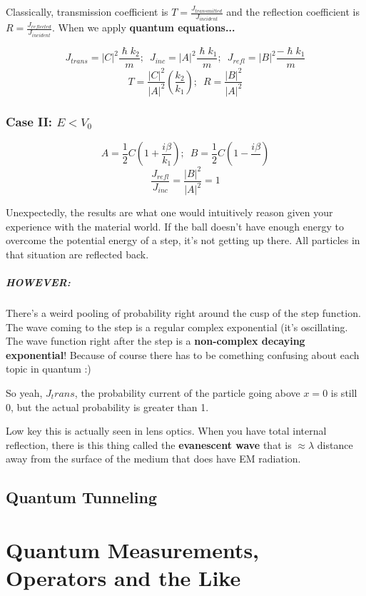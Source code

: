 \documentclass[a4paper,12pt]{report}
\begin{document}
Classically, transmission coefficient is $T = \frac{J_{transmitted}}{J_{incident}}$ and the reflection coefficient is $R = \frac{J_{reflected}}{J_{incident}}$. When we apply \textbf{quantum equations...}

$$J_{trans} = |C|^2\frac{\hslash k_2}{m};\,\,\, J_{inc} = |A|^2\frac{\hslash k_1}{m};\,\,\, J_{refl} = |B|^2 \frac{-\hslash k_1}{m}$$
$$T = \frac{|C|^2}{|A|^2}(\frac{k_2}{k_1});\,\,\, R = \frac{|B|^2}{|A|^2}$$

\subsection{Case II: $E < V_0$}

$$A = \frac{1}{2}C(1 + \frac{i\beta}{k_1});\,\,\, B = \frac{1}{2}C(1-\frac{i\beta}{})$$
$$\frac{J_{refl}}{J_{inc}} = \frac{|B|^2}{|A|^2} = 1$$

Unexpectedly, the results are what one would intuitively reason given your experience with the material world. If the ball doesn't have enough energy to overcome the potential energy of a step, it's not getting up there. All particles in that situation are reflected back.

\paragraph{HOWEVER: } There's a weird pooling of probability right around the cusp of the step function. The wave coming to the step is a regular complex exponential (it's oscillating. The wave function right after the step is a \textbf{non-complex decaying exponential}! Because of course there has to be comething confusing about each topic in quantum :)

So yeah, $J_trans$, the probability current of the particle going above $x = 0$ is still 0, but the actual probability is greater than 1. 

Low key this is actually seen in lens optics. When you have total internal reflection, there is this thing called the \textbf{evanescent wave} that is $\approx \lambda$ distance away from the surface of the medium that does have EM radiation.


\section{Quantum Tunneling}

\chapter{Quantum Measurements, Operators and the Like}
\end{document}
